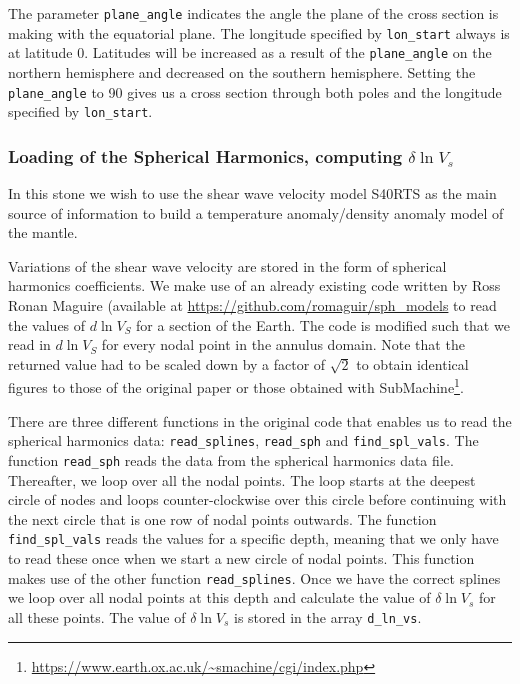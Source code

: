 The parameter \texttt{plane\_angle} indicates the angle the plane of the cross section is making with the equatorial plane. The longitude specified by \texttt{lon\_start} always is at latitude 0. Latitudes will be increased as a result of the \texttt{plane\_angle} on the northern hemisphere and decreased on the southern hemisphere. Setting the \texttt{plane\_angle} to 90 gives us a cross section through both poles and the longitude specified by \texttt{lon\_start}.



\subsubsection*{Loading of the Spherical Harmonics, computing $\delta \ln V_s$}

In this stone we wish to use the shear wave velocity model S40RTS \cite{ridv11} 
as the main source of information 
to build a temperature anomaly/density anomaly model of the mantle. 

Variations of the shear wave velocity are stored in the form of spherical harmonics coefficients. 
We make use of an already existing code written by Ross Ronan Maguire
(available at \url{https://github.com/romaguir/sph_models}
to read the values of $d \ln{V_S}$ for a section of the Earth. 
The code is modified such that we read in $d \ln{V_S}$ for every nodal point in the annulus domain. 
Note that the returned value had to be scaled down by a factor of $\sqrt{2}$ to obtain identical figures to 
those of the original paper or those obtained with SubMachine\footnote{\url{https://www.earth.ox.ac.uk/~smachine/cgi/index.php}}.  




There are three different functions in the original code that enables us to read 
the spherical harmonics data: \texttt{read\_splines}, \texttt{read\_sph} 
and \texttt{find\_spl\_vals}. The function \texttt{read\_sph} reads the data from the spherical 
harmonics data file. Thereafter, we loop over all the nodal points. The loop starts at the 
deepest circle of nodes and loops counter-clockwise over this circle before continuing with the 
next circle that is one row of nodal points outwards. The function \texttt{find\_spl\_vals} 
reads the values for a specific depth, meaning that we only have to read these once when we 
start a new circle of nodal points. This function makes use of the other function \texttt{read\_splines}. 
Once we have the correct splines we loop over all nodal points at this depth and calculate the 
value of $\delta \ln{V_s}$ for all these points. The value of $\delta \ln{V_s}$ 
is stored in the array \texttt{d\_ln\_vs}.

